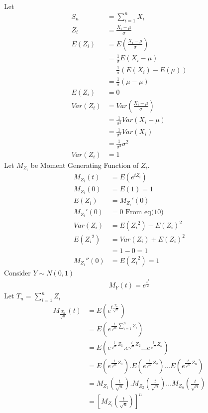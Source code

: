 \documentclass[journal,12pt,twocolumn]{IEEEtran}
\begin{document}
\\Let
\begin{align}
    S_n &= \sum_{i=1}^{n} X_i\\
    Z_i &= \frac{X_i-\mu}{\sigma}\\
    E(Z_i)&=E(\frac{X_i-\mu}{\sigma})\\
    &= \frac{1}{\sigma}E(X_i - \mu)\nonumber\\
    &= \frac{1}{\sigma}(E(X_i)-E(\mu))\nonumber\\
    &= \frac{1}{\sigma}(\mu -\mu)\nonumber\\
    E(Z_i)&=0\\
    Var(Z_i)&=Var(\frac{X_i-\mu}{\sigma})\\
    &=\frac{1}{\sigma^2}Var(X_i-\mu)\nonumber\\
    &=\frac{1}{\sigma^2}Var(X_i)\nonumber\\
    &=\frac{1}{\sigma^2}\sigma^2\nonumber\\
    Var(Z_i)&=1
    \end{align}
Let $M_{Z_i}$ be Moment Generating Function of $Z_i$.
\begin{align}
      M_{Z_i}(t)&=E(e^{tZ_i})\\
      M_{Z_i}(0)&=E(1)=1\\
      E(Z_i)&=M_{Z_i}'(0)\\
      M_{Z_i}'(0)&=0 \text{ From eq(10)}\\
      Var(Z_i)&=E({Z_i}^2)-{E(Z_i)^2}\\
      E({Z_i}^2)&=Var(Z_i)+E(Z_i)^2\nonumber\\
      &=1-0=1\nonumber\\
      M_{Z_i}''(0)&=E({Z_i}^2)=1
    \end{align}
Consider $Y \sim N(0,1)$
\begin{align}
    M_Y(t)=e^{\frac{t^2}{2}}
    \end{align}
Let $T_n=\sum_{i=1}^{n} Z_i$
\begin{align}
    M_{\frac{T_n}{\sqrt{n}}}(t)&=E(e^{t\frac{T_n}{\sqrt{n}}})\\
    &=E(e^{\frac{t}{\sqrt{n}}\sum_{i=1}^{n} Z_i})\nonumber\\
    &=E(e^{\frac{t}{\sqrt{n}}Z_1}.e^{\frac{t}{\sqrt{n}}Z_2}...e^{\frac{t}{\sqrt{n}} Z_n})\nonumber\\
    &=E(e^{\frac{t}{\sqrt{n}}Z_1}).E(e^{\frac{t}{\sqrt{n}}Z_2})...E(e^{\frac{t}{\sqrt{n}}Z_n})\nonumber\\
    &=M_{Z_1}(\frac{t}{\sqrt{n}}).M_{Z_2}(\frac{t}{\sqrt{n}})...M_{Z_n}(\frac{t}{\sqrt{n}})\nonumber\\
    &=[M_{Z_i}(\frac{t}{\sqrt{n}})]^n
    \end{align}
\end{document}
